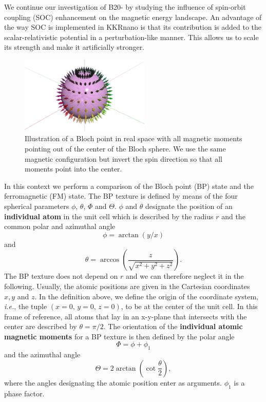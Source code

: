 \documentclass [a4paper, 12pt]{article}
\newcommand{\beq}{\begin{equation}}
\newcommand{\eeq}{\end{equation}}
\begin{document}
We continue our investigation of B20- by studying the influence of spin-orbit
coupling (SOC) enhancement on the magnetic energy landscape.
An advantage of the way SOC is implemented in KKRnano is that
its contribution is added to the scalar-relativistic
potential in a perturbation-like manner. This allows us to scale its strength and make it
artificially stronger.
\begin{figure}
	\includegraphics[width=0.55\textwidth]{Figures/blochpoint.eps}
	\caption{Illustration of a Bloch point in real space with all magnetic moments
	pointing out of the center of the Bloch sphere.
	We use the same magnetic configuration but invert the spin direction so that all moments point
	into the center.	}
	\label{fig:mnge_blochpoint}
\end{figure}
In this context we perform a comparison of the Bloch point (BP) state 
and the ferromagnetic (FM) state.
The BP texture is defined by means of the four spherical parameters $\phi$, $\theta$, 
$\Phi$ and $\Theta$.
$\phi$ and $\theta$ designate the position of an \textbf{individual atom} in the unit cell
which is described by the radius $r$ and the common polar and azimuthal angle
\beq
\phi = \arctan{\left(y/x\right)}
\eeq
and
\beq
\theta = \arccos{\left( \frac{z}{\sqrt{x^2+y^2+z^2}} \right)}.
\eeq
The BP texture does not depend on $r$ and we can therefore neglect it in the following.
Usually, the atomic positions are given in the Cartesian coordinates $x,y$ and $z$.
In the definition above, we define the origin of the coordinate system, \textit{i.e.}, the tuple $(x=0, \, y=0, \, z=0)$,
to be at the center of the unit cell.
In this frame of reference, all atoms that lay in an x-y-plane that intersects with the center
are described by $\theta=\pi/2$.
The orientation of the \textbf{individual atomic magnetic moments} for a BP texture is then defined 
by the polar angle
\beq
\Phi = \phi + \phi_{1}
\eeq
and the azimuthal angle
\beq
\Theta = 2 \arctan{\left(\cot{\frac{\theta}{2}} \right)},
\eeq
where the angles designating the atomic position enter as arguments. $\phi_{1}$ is a phase factor.
\end{document}
